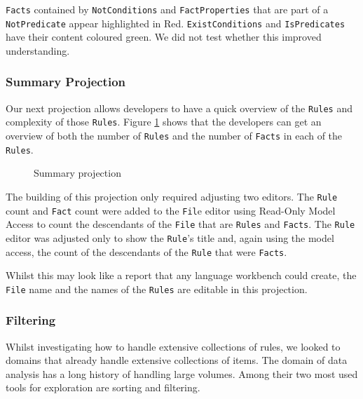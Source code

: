 \texttt{Facts} contained by \texttt{NotConditions} and \texttt{FactProperties} that are part of a \texttt{NotPredicate} appear highlighted in Red.
\texttt{ExistConditions} and \texttt{IsPredicates} have their content coloured green.
We did not test whether this improved understanding.

\subsubsection{Summary Projection}

Our next projection allows developers to have a quick overview of the \texttt{Rules} and complexity of those \texttt{Rules}.
Figure \ref{fig:summaryProjection} shows that the developers can get an overview of both the number of \texttt{Rules} and the number of \texttt{Facts} in each of the \texttt{Rules}.

\begin{figure}
    \centering
    \caption{Summary projection}
    \label{fig:summaryProjection}
\end{figure}

The building of this projection only required adjusting two editors.
The \texttt{Rule} count and \texttt{Fact} count were added to the \texttt{Fil}e editor using Read-Only Model Access to count the descendants of the \texttt{File} that are \texttt{Rules} and \texttt{Facts}.
The \texttt{Rule} editor was adjusted only to show the \texttt{Rule}'s title and, again using the model access, the count of the descendants of the \texttt{Rule} that were \texttt{Facts}.

Whilst this may look like a report that any language workbench could create, the \texttt{File} name and the names of the \texttt{Rules} are editable in this projection.

\subsubsection{Filtering}
Whilst investigating how to handle extensive collections of rules, we looked to domains that already handle extensive collections of items.
The domain of data analysis has a long history of handling large volumes.
Among their two most used tools for exploration are sorting and filtering.

